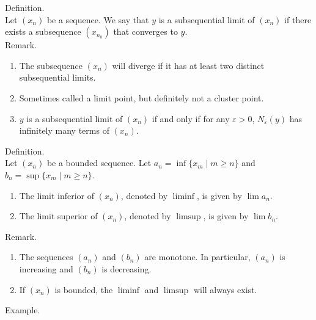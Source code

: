 \documentclass[twocolumn]{article}
\newcommand{\br}{\vspace{\baselineskip}}
\let\eps\varepsilon
\begin{document}
Definition. \\
Let $(x_n)$ be a sequence. We say that $y$ is a subsequential limit of $(x_n)$ if there exists a subsequence $(x_{n_k})$ that converges to $y$. \\

Remark.
\begin{enumerate}
	\item
	The subsequence $(x_n)$ will diverge if it has at least two distinct subsequential limits.
	\item
	Sometimes called a limit point, but definitely not a cluster point.
	\item
	$y$ is a subsequential limit of $(x_n)$ if and only if for any $\eps > 0$, $N_\eps(y)$ has infinitely many terms of $(x_n)$.
\end{enumerate} \br

Definition. \\
Let $(x_n)$ be a bounded sequence. Let $a_n = \inf \{ x_m \mid m \geq n \}$ and $b_n = \sup \{ x_m \mid m \geq n \}$.
\begin{enumerate}
	\item
	The limit inferior of $(x_n)$, denoted by $\liminf$, is given by $\lim a_n$.
	\item
	The limit superior of $(x_n)$, denoted by $\limsup$, is given by $\lim b_n$.
\end{enumerate} \br

Remark. \\
\begin{enumerate}
	\item
	The sequences $(a_n)$ and $(b_n)$ are monotone. In particular, $(a_n)$ is increasing and $(b_n)$ is decreasing.
	\item
	If $(x_n)$ is bounded, the $\liminf$ and $\limsup$ will always exist.
\end{enumerate} \br

Example. \\
\end{document}

